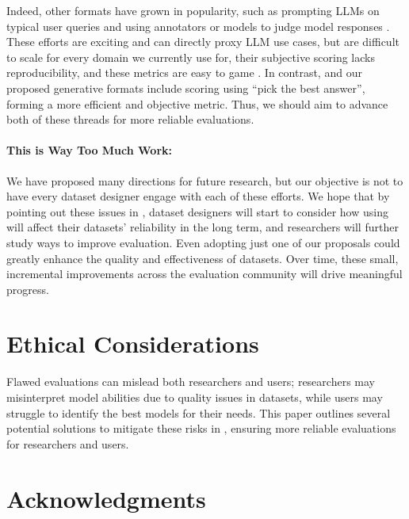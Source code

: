 Indeed, other formats have grown in popularity, such as prompting LLMs on typical user queries and using annotators or models to judge model responses \cite{chiang2024chatbot, lin2024wildbench}.
These efforts are exciting and can directly proxy LLM use cases, but are difficult to scale for every domain we currently use \mcqa for, their subjective scoring lacks reproducibility, and these metrics are easy to game \cite{zheng2025cheating}.
In contrast, \mcqa and our proposed generative formats include scoring using ``pick the best answer'', forming a more efficient and objective metric.
Thus, we should aim to advance both of these threads for more reliable evaluations.

\paragraph{This is Way Too Much Work:}

We have proposed many directions for future research, but our objective is not to have every \mcqa dataset designer engage with each of these efforts.
We hope that by pointing out these issues in \mcqa, dataset designers will start to consider how using \mcqa will affect their datasets' reliability in the long term, and researchers will further study ways to improve \mcqa evaluation.
Even adopting just one of our proposals could greatly enhance the quality and effectiveness of \mcqa datasets.
Over time, these small, incremental improvements across the evaluation community will drive meaningful progress.

\section{Ethical Considerations}

Flawed evaluations can mislead both researchers and users; researchers may misinterpret model abilities due to quality issues in datasets, while users may struggle to identify the best models for their needs.
This paper outlines several potential solutions to mitigate these risks in \mcqa, ensuring more reliable evaluations for researchers and users.


\section*{Acknowledgments}

